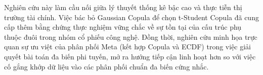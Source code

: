 Nghiên cứu này làm cầu nối giữa lý thuyết thống kê bậc cao và thực tiễn thị trường tài chính. Việc bác bỏ Gaussian Copula để chọn t-Student Copula đã cung cấp thêm bằng chứng thực nghiệm vững chắc về sự tồn tại của cấu trúc phụ thuộc đuôi trong nhóm cổ phiếu công nghệ. Đồng thời, nghiên cứu minh họa trực quan sự ưu việt của phân phối Meta (kết hợp Copula và ECDF) trong việc giải quyết bài toán đa biến phi tuyến, mở ra hướng tiếp cận linh hoạt hơn so với việc cố gắng khớp dữ liệu vào các phân phối chuẩn đa biến cứng nhắc.